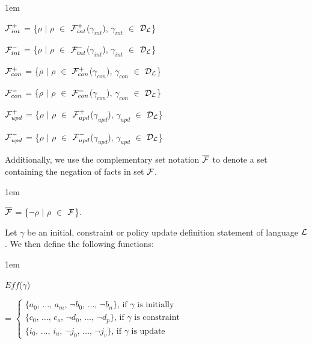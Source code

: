 \documentclass[global,twocolumn,final]{svjour}
\newenvironment{vquote}
  {\begin{list}{}{\leftmargin 1em}\item[]}
  {\end{list}}
\begin{document}
    \begin{vquote}
      ${\cal F}^{+}_{int}$ =
      \{$\rho$ $\mid$ $\rho$ $\in$ ${\cal F}^{+}_{int}$($\gamma_{int}$), $\gamma_{int}$ $\in$ ${\cal D}_{\cal L}$\}

      ${\cal F}^{-}_{int}$ =
      \{$\rho$ $\mid$ $\rho$ $\in$ ${\cal F}^{-}_{int}$($\gamma_{int}$), $\gamma_{int}$ $\in$ ${\cal D}_{\cal L}$\}

      ${\cal F}^{+}_{con}$ =
      \{$\rho$ $\mid$ $\rho$ $\in$ ${\cal F}^{+}_{con}$($\gamma_{con}$), $\gamma_{con}$ $\in$ ${\cal D}_{\cal L}$\}

      ${\cal F}^{-}_{con}$ =
      \{$\rho$ $\mid$ $\rho$ $\in$ ${\cal F}^{-}_{con}$($\gamma_{con}$), $\gamma_{con}$ $\in$ ${\cal D}_{\cal L}$\}

      ${\cal F}^{+}_{upd}$ =
      \{$\rho$ $\mid$ $\rho$ $\in$ ${\cal F}^{+}_{upd}$($\gamma_{upd}$), $\gamma_{upd}$ $\in$ ${\cal D}_{\cal L}$\}

      ${\cal F}^{-}_{upd}$ =
      \{$\rho$ $\mid$ $\rho$ $\in$ ${\cal F}^{-}_{upd}$($\gamma_{upd}$), $\gamma_{upd}$ $\in$ ${\cal D}_{\cal L}$\}
    \end{vquote}

    Additionally, we use the complementary set notation
    $\overline{{\cal F}}$ to denote a set containing the negation of
    facts in set ${\cal F}$.

    \begin{vquote}
      $\overline{{\cal F}}$ =
      \{$\lnot\rho$ $\mid$ $\rho$ $\in$ ${\cal F}$\}.
    \end{vquote}

    Let $\gamma$ be an initial, constraint or policy update definition
    statement of language ${\cal L}$. We then define the following functions:

    \begin{vquote}
      $Eff$($\gamma$)

      \hspace{1em}
      =
      \begin{math}
        \begin{cases}
          \mbox{\{$a_{0}$, \ldots, $a_{m}$, $\lnot$$b_{0}$, \ldots, $\lnot$$b_{n}$\}, if $\gamma$ is initially} \\
          \mbox{\{$c_{0}$, \ldots, $c_{o}$, $\lnot$$d_{0}$, \ldots, $\lnot$$d_{p}$\}, if $\gamma$ is constraint} \\
          \mbox{\{$i_{0}$, \ldots, $i_{u}$, $\lnot$$j_{0}$, \ldots, $\lnot$$j_{v}$\}, if $\gamma$ is update}
        \end{cases}
      \end{math}
    \end{vquote}
\end{document}
